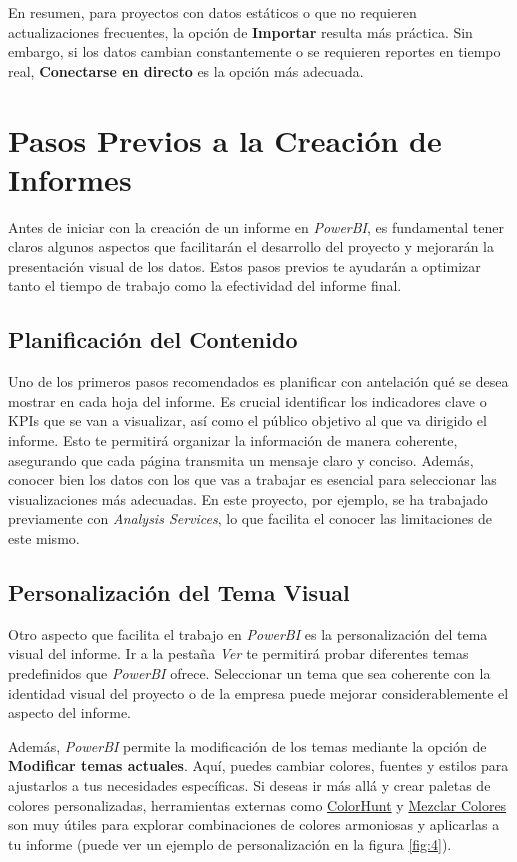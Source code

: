 \documentclass[12pt, a4paper, twoside]{article}
\begin{document}
	En resumen, para proyectos con datos estáticos o que no requieren actualizaciones frecuentes, la opción de \textbf{Importar} resulta más práctica. Sin embargo, si los datos cambian constantemente o se requieren reportes en tiempo real, \textbf{Conectarse en directo} es la opción más adecuada.
	
	
	\section{\textbf{Pasos Previos a la Creación de Informes}}
	
	Antes de iniciar con la creación de un informe en \textit{PowerBI}, es fundamental tener claros algunos aspectos que facilitarán el desarrollo del proyecto y mejorarán la presentación visual de los datos. Estos pasos previos te ayudarán a optimizar tanto el tiempo de trabajo como la efectividad del informe final.
	
	\subsection{\textbf{Planificación del Contenido}}
	
	Uno de los primeros pasos recomendados es planificar con antelación qué se desea mostrar en cada hoja del informe. Es crucial identificar los indicadores clave o KPIs que se van a visualizar, así como el público objetivo al que va dirigido el informe. Esto te permitirá organizar la información de manera coherente, asegurando que cada página transmita un mensaje claro y conciso. Además, conocer bien los datos con los que vas a trabajar es esencial para seleccionar las visualizaciones más adecuadas. En este proyecto, por ejemplo, se ha trabajado previamente con \textit{Analysis Services}, lo que facilita el conocer las limitaciones de este mismo.
	
	\subsection{\textbf{Personalización del Tema Visual}}
	
	Otro aspecto que facilita el trabajo en \textit{PowerBI} es la personalización del tema visual del informe. Ir a la pestaña \textit{Ver} te permitirá probar diferentes temas predefinidos que \textit{PowerBI} ofrece. Seleccionar un tema que sea coherente con la identidad visual del proyecto o de la empresa puede mejorar considerablemente el aspecto del informe.
	
	Además, \textit{PowerBI} permite la modificación de los temas mediante la opción de \textbf{Modificar temas actuales}. Aquí, puedes cambiar colores, fuentes y estilos para ajustarlos a tus necesidades específicas. Si deseas ir más allá y crear paletas de colores personalizadas, herramientas externas como \href{https://colorhunt.co/}{ColorHunt} y \href{https://paletadecolores.online/mezclar-colores/}{Mezclar Colores} son muy útiles para explorar combinaciones de colores armoniosas y aplicarlas a tu informe (puede ver un ejemplo de personalización en la figura \ref{fig:4}).
	
\end{document}
